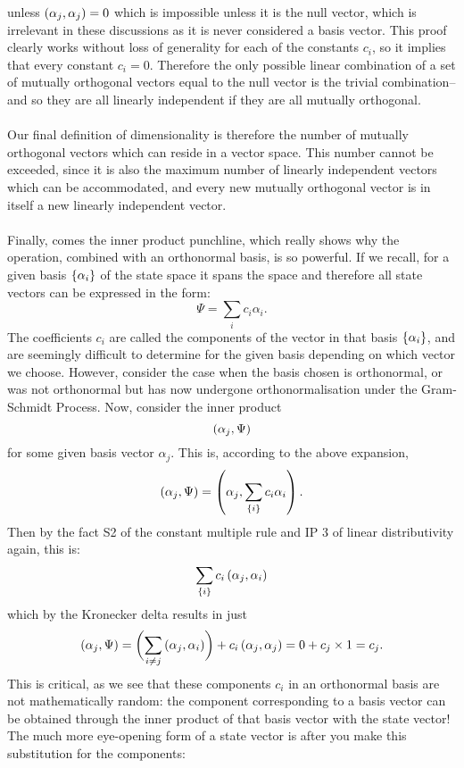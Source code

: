 unless $\left(\alpha_{j},\alpha_{j}\right)=0$ which is impossible unless it is the null vector, which is irrelevant in these discussions as it is never considered a basis vector. This proof clearly works without loss of generality for each of the constants $c_{i}$, so it implies that every constant $c_{i}=0$. Therefore the only possible linear combination of a set of mutually orthogonal vectors equal to the null vector is the trivial combination-- and so they are all linearly independent if they are all mutually orthogonal.
\\\\
Our final definition of dimensionality is therefore the number of mutually orthogonal vectors which can reside in a vector space. This number cannot be exceeded, since it is also the maximum number of linearly independent vectors which can be accommodated, and every new mutually orthogonal vector is in itself a new linearly independent vector. 
\\\\
Finally, comes the inner product punchline, which really shows why the operation, combined with an orthonormal basis, is so powerful. If we recall, for a given basis $\{\alpha_{i}\}$ of the state space it spans the space and therefore all state vectors can be expressed in the form:
$$
\Psi=\sum_{i}c_{i}\alpha_{i}.
$$
The coefficients $c_{i}$ are called the components of the vector in that basis $\{\alpha_{i}\}$, and are seemingly difficult to determine for the given basis depending on which vector we choose. However, consider the case when the basis chosen is orthonormal, or was not orthonormal but has now undergone orthonormalisation under the Gram-Schmidt Process. Now, consider the inner product
$$
\left(\alpha_{j},\Psi\right)
$$
for some given basis vector $\alpha_{j}$. This is, according to the above expansion,
$$
\left(\alpha_{j},\Psi\right)=\left(\alpha_{j},\sum_{\{i\}}c_{i}\alpha_{i}\right).
$$
Then by the fact S2 of the constant multiple rule and IP 3 of linear distributivity again, this is:
$$
\sum_{\{i\}}c_{i}\left(\alpha_{j},\alpha_{i}\right)
$$
which by the Kronecker delta results in just 
$$
\left(\alpha_{j},\Psi\right)=\biggl(\sum_{i\neq j}\left(\alpha_{j},\alpha_{i}\right)\biggr)+c_{i}\left(\alpha_{j},\alpha_{j}\right)=0+c_{j}\times 1=c_{j}.
$$
This is critical, as we see that these components $c_{i}$ in an orthonormal basis are not mathematically random: the component corresponding to a basis vector can be obtained through the inner product of that basis vector with the state vector! The much more eye-opening form of a state vector is after you make this substitution for the components:
